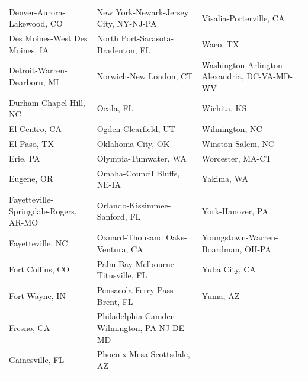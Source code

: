 \begin{longtable}[t]{>{\raggedright\arraybackslash}p{4.6cm}>{\raggedright\arraybackslash}p{4.6cm}>{\raggedright\arraybackslash}p{4.6cm}}
\addlinespace
Denver-Aurora-Lakewood, CO & New York-Newark-Jersey City, NY-NJ-PA & Visalia-Porterville, CA\\
Des Moines-West Des Moines, IA & North Port-Sarasota-Bradenton, FL & Waco, TX\\
Detroit-Warren-Dearborn, MI & Norwich-New London, CT & Washington-Arlington-Alexandria, DC-VA-MD-WV\\
Durham-Chapel Hill, NC & Ocala, FL & Wichita, KS\\
El Centro, CA & Ogden-Clearfield, UT & Wilmington, NC\\
\addlinespace
El Paso, TX & Oklahoma City, OK & Winston-Salem, NC\\
Erie, PA & Olympia-Tumwater, WA & Worcester, MA-CT\\
Eugene, OR & Omaha-Council Bluffs, NE-IA & Yakima, WA\\
Fayetteville-Springdale-Rogers, AR-MO & Orlando-Kissimmee-Sanford, FL & York-Hanover, PA\\
Fayetteville, NC & Oxnard-Thousand Oaks-Ventura, CA & Youngstown-Warren-Boardman, OH-PA\\
\addlinespace
Fort Collins, CO & Palm Bay-Melbourne-Titusville, FL & Yuba City, CA\\
Fort Wayne, IN & Pensacola-Ferry Pass-Brent, FL & Yuma, AZ\\
Fresno, CA & Philadelphia-Camden-Wilmington, PA-NJ-DE-MD & \\
Gainesville, FL & Phoenix-Mesa-Scottsdale, AZ & \\*
\end{longtable}
\endgroup{}
